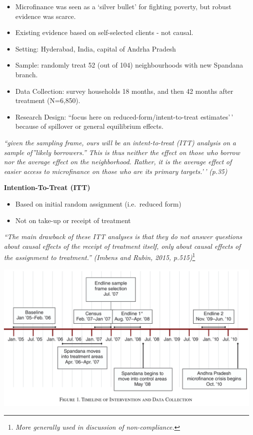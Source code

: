 \documentclass[
  letterpaper,
  DIV=11,
  numbers=noendperiod]{scrreprt}
\providecommand{\tightlist}{%
  \setlength{\itemsep}{0pt}\setlength{\parskip}{0pt}}\usepackage{longtable,booktabs,array}
\theoremstyle{definition}
\theoremstyle{remark}
\begin{document}
\begin{itemize}
\tightlist
\item
  Microfinance was seen as a `silver bullet' for fighting poverty, but
  robust evidence was scarce.
\item
  Existing evidence based on self-selected clients - not causal.
\item
  {Setting:} Hyderabad, India, capital of Andrha Pradesh
\item
  {Sample:} randomly treat 52 (out of 104) neighbourhoods with new
  Spandana branch.
\item
  {Data Collection:} survey households 18 months, and then 42 months
  after treatment (N=6,850).
\item
  {Research Design:} ``focus here on reduced-form/intent-to-treat
  estimates'\,' because of spillover or general equilibrium effects.
\end{itemize}

\emph{``given the sampling frame, ours will be an intent-to-treat (ITT)
analysis on a sample of''likely borrowers.'' This is thus neither the
effect on those who borrow nor the average effect on the neighborhood.
Rather, it is the average effect of easier access to microfinance on
those who are its primary targets.'\,' (p.35)}

\textbf{Intention-To-Treat (ITT)}

\par

\begin{itemize}
\tightlist
\item
  Based on initial random assignment (i.e.~reduced form)
\item
  Not on take-up or receipt of treatment
\end{itemize}

\emph{``The main drawback of these ITT analyses is that they do not
answer questions about causal effects of the receipt of treatment
itself, only about causal effects of the assignment to treatment.''
(Imbens and Rubin, 2015, p.515)}\footnote{\emph{More generally used in
  discussion of non-compliance.}}

\includegraphics{Images/Banerjee_Timeline_1.png}
\end{document}

